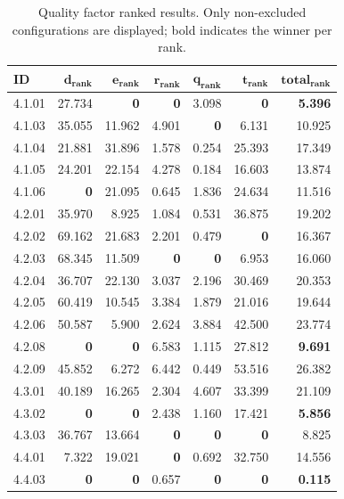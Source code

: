 \begin{table}[!t]
\centering
\footnotesize
\caption{Quality factor ranked results. Only non-excluded configurations are displayed; bold indicates the winner per rank.}
\label{tab:quality_ranked}
\begin{tabular}{@{}lrrrrrr@{}}
\hline
    \textbf{ID} & $\bm{d}_{\textbf{rank}}$ & $\bm{e}_{\textbf{rank}}$ & $\bm{r}_{\textbf{rank}}$ & $\bm{q}_{\textbf{rank}}$ & $\bm{t}_{\textbf{rank}}$ & $\textbf{total}_{\textbf{rank}}$ \\
\hline
    4.1.01 & 27.734 & \textbf{0} & \textbf{0} & 3.098 & \textbf{0} & \textbf{5.396} \\
    4.1.03 & 35.055 & 11.962 & 4.901 & \textbf{0} & 6.131 & 10.925 \\
    4.1.04 & 21.881 & 31.896 & 1.578 & 0.254 & 25.393 & 17.349 \\
    4.1.05 & 24.201 & 22.154 & 4.278 & 0.184 & 16.603 & 13.874 \\
    4.1.06 & \textbf{0} & 21.095 & 0.645 & 1.836 & 24.634 & 11.516 \\
    \noalign{\smallskip}
    4.2.01 & 35.970 & 8.925 & 1.084 & 0.531 & 36.875 & 19.202 \\
    4.2.02 & 69.162 & 21.683 & 2.201 & 0.479 & \textbf{0} & 16.367 \\
    4.2.03 & 68.345 & 11.509 & \textbf{0} & \textbf{0} & 6.953 & 16.060 \\
    4.2.04 & 36.707 & 22.130 & 3.037 & 2.196 & 30.469 & 20.353 \\
    4.2.05 & 60.419 & 10.545 & 3.384 & 1.879 & 21.016 & 19.644 \\
    4.2.06 & 50.587 & 5.900 & 2.624 & 3.884 & 42.500 & 23.774 \\
    4.2.08 & \textbf{0} & \textbf{0} & 6.583 & 1.115 & 27.812 & \textbf{9.691} \\
    4.2.09 & 45.852 & 6.272 & 6.442 & 0.449 & 53.516 & 26.382 \\
    \noalign{\smallskip}
    4.3.01 & 40.189 & 16.265 & 2.304 & 4.607 & 33.399 & 21.109 \\
    4.3.02 & \textbf{0} & \textbf{0} & 2.438 & 1.160 & 17.421 & \textbf{5.856} \\
    4.3.03 & 36.767 & 13.664 & \textbf{0} & \textbf{0} & \textbf{0} & 8.825 \\
    \noalign{\smallskip}
    4.4.01 & 7.322 & 19.021 & \textbf{0} & 0.692 & 32.750 & 14.556 \\
    4.4.03 & \textbf{0} & \textbf{0} & 0.657 & \textbf{0} & \textbf{0} & \textbf{0.115} \\
\hline
\end{tabular}
\end{table}